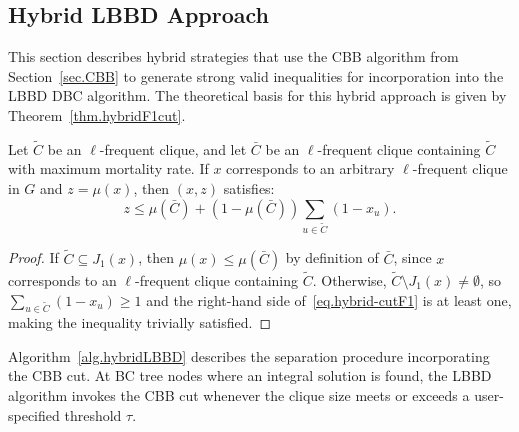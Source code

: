 \subsection{Hybrid LBBD Approach}\label{sec.hybridLBBD}

This section describes hybrid strategies that use the CBB algorithm
from Section~\ref{sec.CBB} to generate strong valid inequalities for
incorporation into the LBBD DBC algorithm. The theoretical basis for
this hybrid approach is given by Theorem~\ref{thm.hybridF1cut}.

\begin{theorem}\label{thm.hybridF1cut}
Let $\widetilde{C}$ be an $\ell$-frequent clique, and let $\bar{C}$
be an $\ell$-frequent clique containing $\widetilde{C}$ with maximum
mortality rate. If $x$ corresponds to an arbitrary $\ell$-frequent
clique in $G$ and $z = \mu(x)$, then $(x,z)$ satisfies:
\begin{equation} \label{eq.hybrid-cutF1}
z \le \mu(\bar{C}) + (1-\mu(\bar{C})) \sum_{u \in \widetilde{C}}
(1 - x_u).
\end{equation}
\end{theorem}

\begin{proof}
If $\widetilde{C} \subseteq J_1(x)$, then $\mu(x) \le \mu(\bar{C})$
by definition of $\bar{C}$, since $x$ corresponds to an
$\ell$-frequent clique containing $\widetilde{C}$. Otherwise,
$\widetilde{C} \setminus J_1(x) \ne \emptyset$, so
$\sum_{u \in \widetilde{C}} (1 - x_u) \ge 1$ and the right-hand side
of~\eqref{eq.hybrid-cutF1} is at least one, making the inequality
trivially satisfied.
\end{proof}

Algorithm~\ref{alg.hybridLBBD} describes the separation procedure
incorporating the CBB cut. At BC tree nodes where an integral solution
is found, the LBBD algorithm invokes the CBB cut whenever the clique
size meets or exceeds a user-specified threshold $\tau$.

